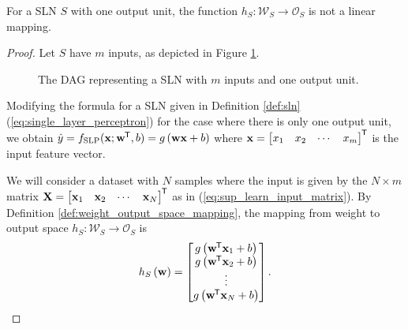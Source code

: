 \begin{theorem}
    \label{thm:sln_one_output}
    For a SLN $S$ with one output unit, the function $h_S: \mathcal{W}_S \rightarrow \mathcal{O}_S$ is not a linear mapping.
\end{theorem}
\begin{proof}
    Let $S$ have $m$ inputs, as depicted in Figure \ref{fig:sln_m_in_1_out}.
    \begin{figure}
        \begin{center}
        \end{center}
        \caption{The DAG representing a SLN with $m$ inputs and one output unit.}
        \label{fig:sln_m_in_1_out}
    \end{figure}
    Modifying the formula for a SLN given in Definition \ref{def:sln} (\ref{eq:single_layer_perceptron}) for the case where there is only one output unit, we obtain
    $\hat{y} = f_\text{SLP}(\mathbf{x}; \mathbf{w}^{\mkern-1.5mu\mathsf{T}}, b) = g\left(\mathbf{w} \mathbf{x} + b\right)$
    where
    $\mathbf{x} = \begin{bmatrix}
        x_1 & x_2 & \cdots & x_m
    \end{bmatrix}^{\mkern-1.5mu\mathsf{T}}$
    is the input feature vector.

    We will consider a dataset with $N$ samples where the input is given by the $N\times m$ matrix
    $\mathbf{X} = \begin{bmatrix}
        \mathbf{x}_1 & \mathbf{x}_2 & \cdots & \mathbf{x}_N
    \end{bmatrix}^{\mkern-1.5mu\mathsf{T}}$
    as in (\ref{eq:sup_learn_input_matrix}).
    By Definition \ref{def:weight_output_space_mapping}, the mapping from weight to output space $h_S: \mathcal{W}_S \rightarrow \mathcal{O}_S$ is
    \begin{equation*}
        h_S \left( \mathbf{w} \right)
        = \begin{bmatrix}
            g \left( \mathbf{w}^{\mkern-1.5mu\mathsf{T}} \mathbf{x}_1 + b \right) \\
            g \left( \mathbf{w}^{\mkern-1.5mu\mathsf{T}} \mathbf{x}_2 + b \right) \\
            \vdots \\
            g \left( \mathbf{w}^{\mkern-1.5mu\mathsf{T}} \mathbf{x}_N + b \right) \\
        \end{bmatrix}.
    \end{equation*}


\end{proof}
